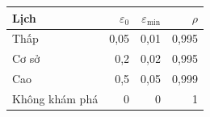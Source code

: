 \begin{tabular}{lrrr}
\toprule
Lịch & $\varepsilon_0$ & $\varepsilon_{\min}$ & $\rho$ \\
\midrule
Thấp & 0{,}05 & 0{,}01 & 0{,}995 \\
Cơ sở & 0{,}2 & 0{,}02 & 0{,}995 \\
Cao & 0{,}5 & 0{,}05 & 0{,}999 \\
Không khám phá & 0 & 0 & 1 \\
\bottomrule
\end{tabular}
